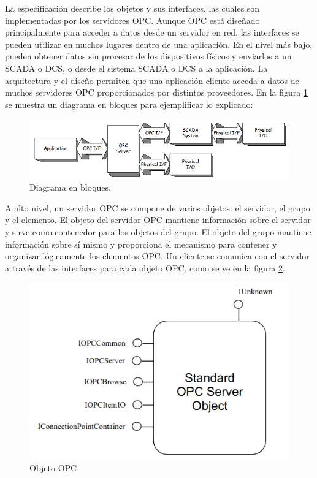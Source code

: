 La especificación describe los objetos y sus interfaces, las cuales son implementadas por los servidores OPC. Aunque OPC está diseñado principalmente para acceder a datos desde un servidor en red, las interfaces se pueden utilizar en muchos lugares dentro de una aplicación. En el nivel más bajo, pueden obtener datos sin procesar de los dispositivos físicos y enviarlos a un SCADA o DCS, o desde el sistema SCADA o DCS a la aplicación. La arquitectura y el diseño permiten que una aplicación cliente acceda a datos de muchos servidores OPC proporcionados por distintos proveedores. En la figura \ref{fig:OPCbloques} se muestra un diagrama en bloques para ejemplificar lo explicado:

\begin{figure}[htpb]
	\centering
	\includegraphics[scale=0.5]{./Figures/opc_2.png}
	\caption{Diagrama en bloques\protect\footnotemark.}
	\label{fig:OPCbloques}
\end{figure}


A alto nivel, un servidor OPC se compone de varios objetos: el servidor, el grupo y el elemento. El objeto del servidor OPC mantiene información sobre el servidor y sirve como contenedor para los objetos del grupo. El objeto del grupo mantiene información sobre sí mismo y proporciona el mecanismo para contener y organizar lógicamente los elementos OPC. Un cliente se comunica con el servidor a través de las interfaces para cada objeto OPC, como se ve en la figura \ref{fig:OPCapi}.

\begin{figure}[htpb]
	\centering
	\includegraphics[scale=0.4]{./Figures/opc_3.png}
	\caption{Objeto OPC\protect\footnotemark.}
	\label{fig:OPCapi}
\end{figure}

